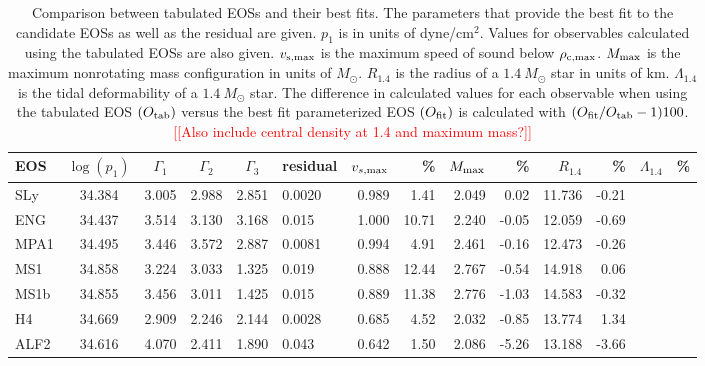 \documentclass[twocolumn,prd,amssymb,aps,nofootinbib,showpacs,epsf]{revtex4}
\newcommand{\red}{\textcolor{red}}
\begin{document}
\begin{table}[!htb]
\begin{center}
\caption{Comparison between tabulated EOSs and their best fits. The parameters that provide the best fit to the candidate EOSs as well as the residual are given. $p_1$ is in units of dyne/cm$^2$. Values for observables calculated using the tabulated EOSs are also given. $v_{\rm s,max}$ is the maximum speed of sound below $\rho_{\rm c, max}$. $M_{\rm max}$ is the maximum nonrotating mass configuration in units of $M_\odot$. $R_{1.4}$ is the radius of a $1.4~M_\odot$ star in units of km. $\Lambda_{1.4}$ is the tidal deformability of a $1.4~M_\odot$ star. The difference in calculated values for each observable when using the tabulated EOS $(O_{\rm tab})$ versus the best fit parameterized EOS $(O_{\rm fit})$ is calculated with $(O_{\rm fit}/O_{\rm tab}-1)100$. \red{[[Also include central density at 1.4 and maximum mass?]]} }
\begin{tabular}{l|ccccl|rr|rr|rr|rr}
\hline\hline
EOS & $\log(p_1)$ & $\Gamma_1$ & $\Gamma_2$ & $\Gamma_3$ & residual &
$v_{s, \rm max}$ & \% & $M_{\rm max}$ & \% & $R_{1.4}$ & \% & $\Lambda_{1.4}$ & \% \\
\hline
SLy&34.384&3.005&2.988&2.851&0.0020& 0.989&1.41& 2.049&0.02& 11.736&-0.21\\
ENG&34.437&3.514&3.130&3.168&0.015& 1.000&10.71& 2.240&-0.05& 12.059&-0.69\\
MPA1&34.495&3.446&3.572&2.887&0.0081& 0.994&4.91& 2.461&-0.16& 12.473&-0.26\\
MS1&34.858&3.224&3.033&1.325&0.019& 0.888&12.44& 2.767&-0.54& 14.918&0.06\\
MS1b&34.855&3.456&3.011&1.425&0.015& 0.889&11.38& 2.776&-1.03& 14.583&-0.32\\
H4&34.669&2.909&2.246&2.144&0.0028& 0.685&4.52& 2.032&-0.85& 13.774&1.34\\
ALF2&34.616&4.070&2.411&1.890&0.043& 0.642&1.50& 2.086&-5.26& 13.188&-3.66\\
\hline\hline
\end{tabular}
\label{tab:eosfit}
\end{center}
\end{table}
\end{document}
